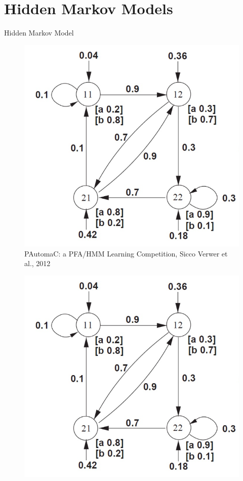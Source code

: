 \section{Hidden Markov Models}

\begin{frame}
Hidden Markov Model
\begin{figure}
\centering
	\includegraphics[scale=0.28]{./content/hmm}
	\caption{PAutomaC: a PFA/HMM Learning Competition, Sicco Verwer et al., 2012}
\end{figure}
\end{frame}


\begin{frame}
\begin{figure}
	\includegraphics[scale=0.15]{./content/hmm}
\end{figure}
\end{frame}









